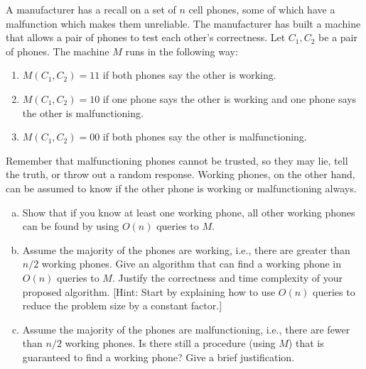 \documentclass[11pt]{article}
\begin{document}
    \begin{tcolorbox}[title={Problem 3 (Malfunctioning Phones, 40 pts)}]
        A manufacturer has a recall on a set of $n$ cell phones, some of which have a malfunction which makes them unreliable. The manufacturer has built a machine that allows a pair of phones to test each other's correctness. Let $C_1, C_2$ be a pair of phones. The machine $M$ runs in the following way:
        \begin{enumerate}
            \item $M(C_1, C_2) = 11$ if both phones say the other is working.
            \item $M(C_1, C_2) = 10$ if one phone says the other is working and one phone says the other is malfunctioning. 
            \item $M(C_1, C_2) = 00$ if both phones say the other is malfunctioning. 
        \end{enumerate}
        Remember that malfunctioning phones cannot be trusted, so they may lie, tell the truth, or throw out a random response. Working phones, on the other hand, can be assumed to know if the other phone is working or malfunctioning always. 
        \begin{enumerate}[(a)]
            \item Show that if you know at least one working phone, all other working phones can be found by using $O(n)$ queries to $M$.
            \item Assume the majority of the phones are working, i.e., there are greater than $n/2$ working phones. Give an algorithm that can find a working phone in $O(n)$ queries to $M$. Justify the correctness and time complexity of your proposed algorithm. [Hint: Start by explaining how to use $O(n)$ queries to reduce the problem size by a constant factor.]
            \item Assume the majority of the phones are malfunctioning, i.e., there are fewer than $n/2$ working phones. Is there still a procedure (using $M$) that is guaranteed to find a working phone? Give a brief justification.
        \end{enumerate}
    \end{tcolorbox}
    
\end{document}

